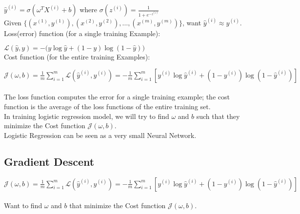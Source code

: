 \documentclass{article}
\begin{document}
    $\hat{y}^{(i)} = \sigma{(\omega^{T}X^{(i)} + b)}$ where $\sigma(z^{(i)}) = \frac{1}{1+e^{{-z}^{(i)}}}$\\

    Given $\{(x^{(1)}, y^{(1)}), (x^{(2)}, y^{(2)}), \hdots, (x^{(m)}, y^{(m)})\}$, want $\hat{y}^{(i)} \approx y^{(i)}$. \\

    Loss(error) function (for a single training Example):

    $\displaystyle \mathcal{L}(\hat{y}, y) = -(y\log{\hat{y}} + (1-y)\log{(1-\hat{y}))}$\\

    Cost function (for the entire training Examples):

    $\displaystyle \mathcal{J}(\omega, b) = \frac{1}{m}\sum_{i=1}^{m} \mathcal{L}(\hat{y}^{(i)}, y^{(i)}) = -\frac{1}{m}\sum_{i=1}^{m} [y^{(i)}\log{\hat{y}^{(i)}} + (1-y^{(i)})\log{(1-\hat{y}^{(i)})}]$\\\\

    The loss function computes the error for a single training example; the cost function is the average of the loss functions of the entire training set.\\

    In training logistic regression model, we will try to find $\omega$ and $b$ such that they minimize the Cost function $\mathcal{J}(\omega, b)$.\\

    Logistic Regression can be seen as a very small Neural Network.\\


\newpage
\subsection{Gradient Descent}

$\displaystyle \mathcal{J}(\omega, b) = \frac{1}{m}\sum_{i=1}^{m} \mathcal{L}(\hat{y}^{(i)}, y^{(i)}) = -\frac{1}{m}\sum_{i=1}^{m} [y^{(i)}\log{\hat{y}^{(i)}} + (1-y^{(i)})\log{(1-\hat{y}^{(i)})}]$\\\\

    Want to find $\omega$ and $b$ that minimize the Cost function $\mathcal{J}(\omega,b)$.

\\
\end{document}
